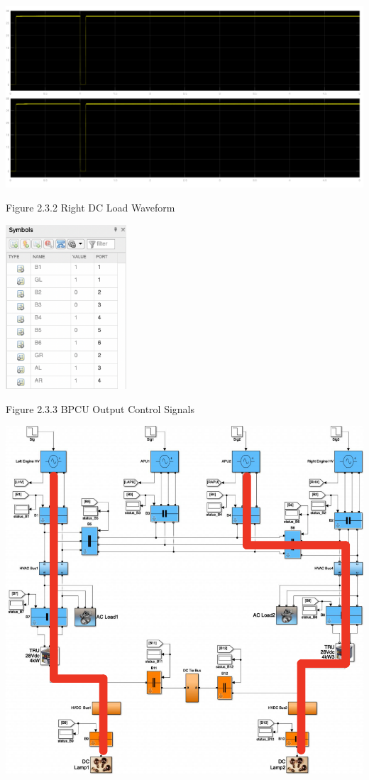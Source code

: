 \documentclass{mcmthesis}
\begin{document}
\includegraphics[trim= 0 0.255\imageheight{} 0 0, clip, width = 0.185\imageheight{}]{gr_down_load2.png}
\begin{center}
\small{Figure 2.3.2 Right DC Load Waveform}
\end{center}
\begin{center}
\includegraphics[width=4.5cm]{gr_down_signals.png}
\end{center}
\begin{center}
\small{Figure 2.3.3 BPCU Output Control Signals}
\end{center}
\begin{center}
\includegraphics[width=14.5cm]{gr_down.png}
\end{center}
\end{document}
